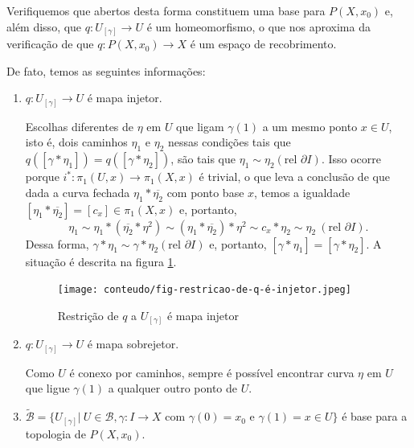 \begin{dem}
     
     Verifiquemos que abertos desta forma constituem uma base para $P(X,x_0)$ e, além disso, que $q:U_{[\gamma]}\rightarrow U$ é um homeomorfismo, o que nos aproxima da verificação de que $q:P(X,x_0)\rightarrow X$ é um espaço de recobrimento.\newline

     De fato, temos as seguintes informações:

     \begin{enumerate}
        \item  $q:U_{[\gamma]}\rightarrow U$ é mapa injetor.\newline
        
        Escolhas diferentes de $\eta$ em $U$ que ligam $\gamma(1)$ a um mesmo ponto $x\in U$, isto é, dois caminhos $\eta_1$ e $\eta_2$ nessas condições tais que $q([\gamma*\eta_1])=q([\gamma*\eta_2])$, são tais que $\eta_1\sim \eta_2 (\text{rel }\partial I)$. Isso ocorre porque $i^*:\pi_1(U,x)\rightarrow \pi_1(X,x)$ é trivial, o que leva a conclusão de que dada a curva fechada $\eta_1* \overline{\eta_2}$ com ponto base $x$, temos a igualdade $[\eta_1* \overline{\eta_2}]=[c_x]\in \pi_1(X,x)$ e, portanto, $$\eta_1\sim\eta_1*(\overline{\eta_2}*\eta^2)\sim (\eta_1*\overline{\eta_2})*\eta^2\sim c_x*\eta_2\sim  \eta_2~(\text{rel }\partial I).$$  Dessa forma, $\gamma*\eta_1\sim \gamma*\eta_2 (\text{rel }\partial I)$ e, portanto, $[\gamma*\eta_1]=[\gamma*\eta_2]$. A situação é descrita na figura \ref{fig:restricao-de-q-é-injetor}.

        \begin{figure}[h!]
         \centering
         \texttt{[image: conteudo/fig-restricao-de-q-é-injetor.jpeg]}
         \caption{Restrição de $q$ a $U_{[\gamma]}$ é mapa injetor}
         \label{fig:restricao-de-q-é-injetor}
     \end{figure} 
     
         \item $q:U_{[\gamma]}\rightarrow U$ é mapa sobrejetor.\newline
         
         Como $U$ é conexo por caminhos, sempre é possível encontrar curva $\eta$ em $U$ que ligue $\gamma(1)$ a qualquer outro ponto de $U$.\newline
         
         \item $\tilde{\mathcal{B}}=\{U_{[\gamma]}|~U\in \mathcal{B}, \gamma:I\rightarrow X\text{ com }\gamma(0)=x_0\text{ e }\gamma(1)=x\in U\}$ é base para a topologia de $P(X,x_0)$.\newline
         

\end{enumerate}
\end{dem}
